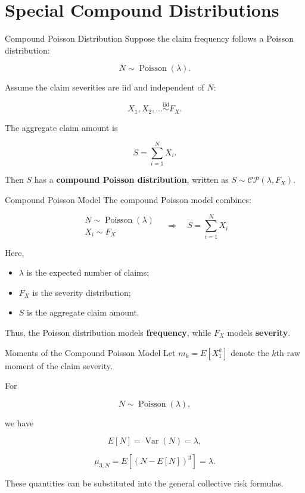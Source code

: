 \documentclass[
  ignorenonframetext,
  aspectratio=169,
]{beamer}
\providecommand{\tightlist}{%
  \setlength{\itemsep}{0pt}\setlength{\parskip}{0pt}}
\begin{document}
\section{Special Compound
Distributions}\label{special-compound-distributions}

\begin{frame}{Compound Poisson Distribution}
\protect{}\label{compound-poisson-distribution}
Suppose the claim frequency follows a Poisson distribution:

\[
N\sim\operatorname{Poisson}(\lambda).
\]

Assume the claim severities are iid and independent of \(N\):

\[
X_1,X_2,\ldots\overset{\mathrm{iid}}{\sim}F_X.
\]

The aggregate claim amount is

\[
S=\sum_{i=1}^{N}X_i.
\]

Then \(S\) has a \textbf{compound Poisson distribution}, written as
\(\boxed{S\sim\mathcal{CP}(\lambda,F_X)}.\)
\end{frame}

\begin{frame}{Compound Poisson Model}
\protect{}\label{compound-poisson-model}
The compound Poisson model combines:

\[
\boxed{
\begin{array}{c}
N\sim\operatorname{Poisson}(\lambda)\\
X_i\sim F_X
\end{array}
}
\quad\Longrightarrow\quad
\boxed{
S=\sum_{i=1}^{N}X_i
}
\]

Here,

\begin{itemize}
\tightlist
\item
  \(\lambda\) is the expected number of claims;
\item
  \(F_X\) is the severity distribution;
\item
  \(S\) is the aggregate claim amount.
\end{itemize}

Thus, the Poisson distribution models \textbf{frequency}, while \(F_X\)
models \textbf{severity}.
\end{frame}

\begin{frame}{Moments of the Compound Poisson Model}
\protect{}\label{moments-of-the-compound-poisson-model}
Let \(m_k=E[X_1^k]\) denote the \(k\)th raw moment of the claim
severity.

For

\[
N\sim\operatorname{Poisson}(\lambda),
\]

we have

\[
E[N]=\operatorname{Var}(N)=\lambda,
\]

\[
\mu_{3,N}
=
E[(N-E[N])^3]
=
\lambda.
\]

These quantities can be substituted into the general collective risk
formulas.
\end{frame}
\end{document}
